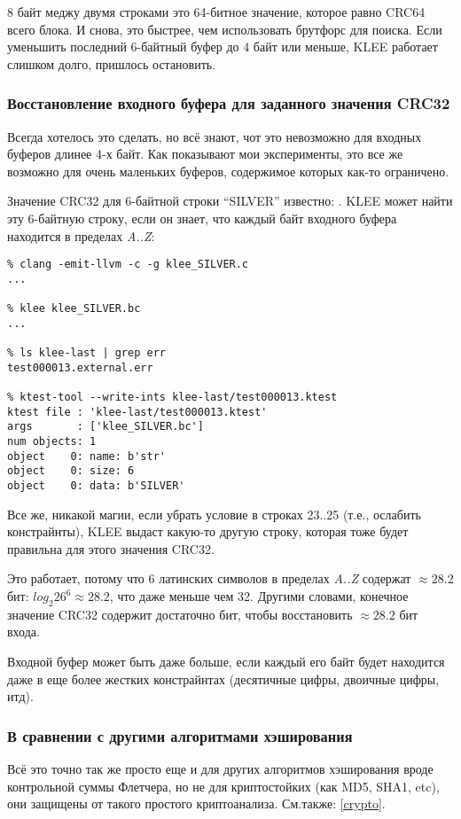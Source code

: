 8 байт меджу двумя строками это 64-битное значение, которое равно CRC64 всего блока.
И снова, это быстрее, чем использовать брутфорс для поиска.
Если уменьшить последний 6-байтный буфер до 4 байт или меньше, KLEE работает слишком долго, пришлось остановить.

\subsubsection{Восстановление входного буфера для заданного значения CRC32}

Всегда хотелось это сделать, но всё знают, чот это невозможно для входных буферов длинее 4-х байт.
Как показывают мои эксперименты, это все же возможно для очень маленьких буферов, содержимое которых как-то ограничено.

Значение CRC32 для 6-байтной строки ``SILVER'' известно: .
KLEE может найти эту 6-байтную строку, если он знает, что каждый байт входного буфера находится в пределах \textit{A..Z}:



\begin{lstlisting}
% clang -emit-llvm -c -g klee_SILVER.c
...

% klee klee_SILVER.bc
...

% ls klee-last | grep err
test000013.external.err

% ktest-tool --write-ints klee-last/test000013.ktest
ktest file : 'klee-last/test000013.ktest'
args       : ['klee_SILVER.bc']
num objects: 1
object    0: name: b'str'
object    0: size: 6
object    0: data: b'SILVER'
\end{lstlisting}

Все же, никакой магии, если убрать условие в строках 23..25 (т.е., ослабить констрайнты),
KLEE выдаст какую-то другую строку, которая тоже будет правильна для этого значения CRC32.

Это работает, потому что 6 латинских символов в пределах \textit{A..Z} содержат $\approx 28.2$ бит:
$log_2{26^6} \approx 28.2$, что даже меньше чем 32.
Другими словами, конечное значение CRC32 содержит достаточно бит, чтобы восстановить $\approx 28.2$ бит входа.

Входной буфер может быть даже больше, если каждый его байт будет находится даже в еще более
жестких констрайнтах (десятичные цифры, двоичные цифры, итд).

\subsubsection{В сравнении с другими алгоритмами хэширования}

Всё это точно так же просто еще и для других алгоритмов хэширования вроде контрольной суммы Флетчера,
но не для криптостойких (как MD5, SHA1, etc), они защищены от такого простого криптоанализа.
См.также: \ref{crypto}.

